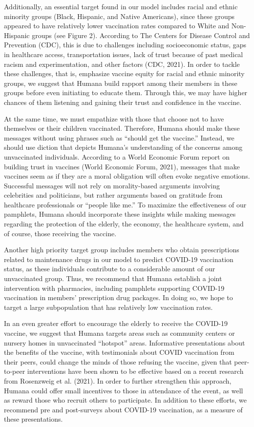 \documentclass[
  12pt,
]{article}
\begin{document}
Additionally, an essential target found in our model includes racial and
ethnic minority groups (Black, Hispanic, and Native Americans), since
these groups appeared to have relatively lower vaccination rates
compared to White and Non-Hispanic groups (see Figure 2). According to
The Centers for Disease Control and Prevention (CDC), this is due to
challenges including socioeconomic status, gaps in healthcare access,
transportation issues, lack of trust because of past medical racism and
experimentation, and other factors (CDC, 2021). In order to tackle these
challenges, that is, emphasize vaccine equity for racial and ethnic
minority groups, we suggest that Humana build rapport among their
members in these groups before even initiating to educate them. Through
this, we may have higher chances of them listening and gaining their
trust and confidence in the vaccine.

At the same time, we must empathize with those that choose not to have
themselves or their children vaccinated. Therefore, Humana should make
these messages without using phrases such as ``should get the vaccine.''
Instead, we should use diction that depicts Humana's understanding of
the concerns among unvaccinated individuals. According to a World
Economic Forum report on building trust in vaccines (World Economic
Forum, 2021), messages that make vaccines seem as if they are a moral
obligation will often evoke negative emotions. Successful messages will
not rely on morality-based arguments involving celebrities and
politicians, but rather arguments based on gratitude from healthcare
professionals or ``people like me.'' To maximize the effectiveness of
our pamphlets, Humana should incorporate these insights while making
messages regarding the protection of the elderly, the economy, the
healthcare system, and of course, those receiving the vaccine.

Another high priority target group includes members who obtain
prescriptions related to maintenance drugs in our model to predict
COVID-19 vaccination status, as these individuals contribute to a
considerable amount of our unvaccinated group. Thus, we recommend that
Humana establish a joint intervention with pharmacies, including
pamphlets supporting COVID-19 vaccination in members' prescription drug
packages. In doing so, we hope to target a large subpopulation that has
relatively low vaccination rates.

In an even greater effort to encourage the elderly to receive the
COVID-19 vaccine, we suggest that Humana targets areas such as community
centers or nursery homes in unvaccinated ``hotspot'' areas. Informative
presentations about the benefits of the vaccine, with testimonials about
COVID vaccination from their peers, could change the minds of those
refusing the vaccine, given that peer-to-peer interventions have been
shown to be effective based on a recent research from Rosenzweig et al.
(2021). In order to further strengthen this approach, Humana could offer
small incentives to those in attendance of the event, as well as reward
those who recruit others to participate. In addition to these efforts,
we recommend pre and post-surveys about COVID-19 vaccination, as a
measure of these presentations.
\end{document}
